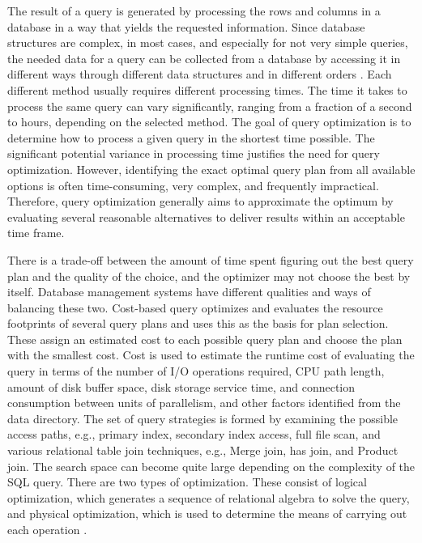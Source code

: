 The result of a query is generated by processing the rows and columns in a database in a way that yields the requested information. Since database structures are complex, in most cases, and especially for not very simple queries, the needed data for a query can be collected from a database by accessing it in different ways through different data structures and in different orders \cite{selinger-1979}. Each different method usually requires different processing times. The time it takes to process the same query can vary significantly, ranging from a fraction of a second to hours, depending on the selected method. The goal of query optimization is to determine how to process a given query in the shortest time possible. The significant potential variance in processing time justifies the need for query optimization. However, identifying the exact optimal query plan from all available options is often time-consuming, very complex, and frequently impractical. Therefore, query optimization generally aims to approximate the optimum by evaluating several reasonable alternatives to deliver results within an acceptable time frame. \vspace{.4cm}

There is a trade-off between the amount of time spent figuring out the best query plan and the quality of the choice, and the optimizer may not choose the best by itself. Database management systems have different qualities and ways of balancing these two. Cost-based query optimizes and evaluates the resource footprints of several query plans and uses this as the basis for plan selection. These assign an estimated cost to each possible query plan and choose the plan with the smallest cost. Cost is used to estimate the runtime cost of evaluating the query in terms of the number of I/O operations required, CPU path length, amount of disk buffer space, disk storage service time, and connection consumption between units of parallelism, and other factors identified from the data directory. The set of query strategies is formed by examining the possible access paths, e.g., primary index, secondary index access, full file scan, and various relational table join techniques, e.g., Merge join, has join, and Product join. The search space can become quite large depending on the complexity of the SQL query. There are two types of optimization. These consist of logical optimization, which generates a sequence of relational algebra to solve the query, and physical optimization, which is used to determine the means of carrying out each operation \cite{dremio-2024}.\vspace{.4cm}

